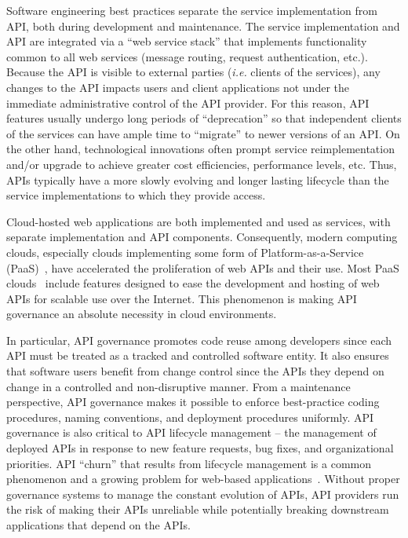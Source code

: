 Software engineering best practices separate the service implementation
from API, both during development and maintenance.
The service implementation and API are integrated via 
a ``web service stack'' that implements functionality common to all web
services (message routing, request authentication, etc.).
Because the API is visible to external parties ({\em i.e.} clients of the
services), any changes to the API
impacts users and client applications not under the immediate administrative control
of the API provider.  For this reason, API features 
usually undergo long
periods of ``deprecation'' so that independent clients of the services can have
ample time to ``migrate'' to newer versions of an API.  On the other hand,
technological innovations often prompt service reimplementation and/or 
upgrade to
achieve greater cost efficiencies, performance levels, etc.
Thus, APIs typically have a more
slowly evolving and longer lasting lifecycle than the service
implementations to which they provide access. 

Cloud-hosted web applications are both implemented and used as
services, with separate implementation and API components.
Consequently, modern computing clouds, especially clouds implementing some form
of Platform-as-a-Service (PaaS)~\cite{4548165}, have accelerated the
proliferation of web APIs and their use.  Most PaaS
clouds~\cite{appscale13,cloudfoundry,openshift} include
features designed to
ease the development and hosting of web APIs for scalable use over the Internet. 
This phenomenon is making API governance an absolute necessity in cloud
environments.

In particular, API governance promotes code reuse among developers
since each API must be treated as a tracked and controlled software entity.
It also ensures that software users benefit from change control since the APIs
they depend on
change in a controlled and non-disruptive manner.  From a maintenance
perspective, API governance 
makes it possible to enforce best-practice coding procedures, 
naming conventions, and deployment procedures uniformly.
API governance is also critical to API lifecycle
management --  the management of deployed APIs in response to new feature
requests, bug fixes, and organizational priorities. 
API ``churn'' that results from lifecycle management
is a common phenomenon and a growing
problem for web-based applications~\cite{6930607}.
Without proper governance systems to manage the constant evolution of APIs,
API providers run the risk of making their APIs unreliable while potentially
breaking downstream applications that depend on the APIs.

